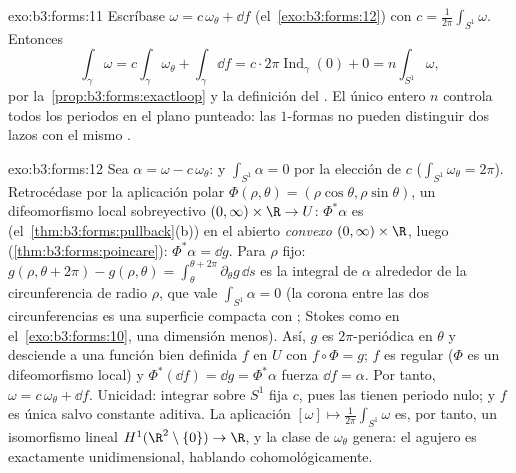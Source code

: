 \begin{solution}{exo:b3:forms:11}
Escríbase $\omega = c\,\omega_\theta + \dd f$
(el~\cref{exo:b3:forms:12}) con $c =
\frac1{2\pi}\int_{S^1}\omega$. Entonces
\[
\int_\gamma\omega = c\int_\gamma\omega_\theta +
\int_\gamma\dd f
= c\cdot2\pi\operatorname{Ind}_\gamma(0) + 0
= n\int_{S^1}\omega,
\]
por la~\cref{prop:b3:forms:exactloop} y la definición del . El
único entero $n$ controla todos los periodos en el plano punteado: las
$1$-formas  no pueden
distinguir dos lazos con el mismo .
\end{solution}

\begin{solution}{exo:b3:forms:12}
Sea $\alpha = \omega - c\,\omega_\theta$:
 y $\int_{S^1}\alpha = 0$ por
la elección de $c$ ($\int_{S^1}\omega_\theta = 2\pi$). Retrocédase por
la aplicación polar
$\Phi(\rho, \theta) = (\rho\cos\theta, \rho\sin\theta)$, un
difeomorfismo local sobreyectivo $(0, \infty)\times\R \to
U$: $\Phi^*\alpha$ es 
(el~\cref{thm:b3:forms:pullback}(b)) en el abierto \emph{convexo}
$(0,\infty)\times\R$, luego 
(\cref{thm:b3:forms:poincare}): $\Phi^*\alpha = \dd g$.
Para $\rho$ fijo: $g(\rho, \theta + 2\pi) - g(\rho, \theta)
= \int_\theta^{\theta + 2\pi}\partial_\theta g\,\dd s$ es la integral de
$\alpha$ alrededor de la circunferencia de radio $\rho$, que vale
$\int_{S^1}\alpha = 0$ (la corona entre las dos circunferencias es una
superficie compacta con
; Stokes como en
el~\cref{exo:b3:forms:10}, una dimensión menos). Así, $g$ es
$2\pi$-periódica en $\theta$ y desciende a una función bien definida $f$
en $U$ con $f\circ\Phi = g$; $f$ es regular ($\Phi$ es un difeomorfismo
local) y $\Phi^*(\dd f) = \dd g = \Phi^*\alpha$ fuerza $\dd f =
\alpha$. Por tanto, $\omega = c\,\omega_\theta + \dd f$. Unicidad:
integrar sobre $S^1$ fija $c$, pues las
 tienen periodo nulo; y
$f$ es única salvo constante aditiva. La aplicación $[\omega] \mapsto
\frac1{2\pi}\int_{S^1}\omega$ es, por tanto, un isomorfismo lineal
$H^1(\R^2\setminus\{0\}) \to \R$, y la clase de $\omega_\theta$ genera:
el agujero es exactamente unidimensional, hablando cohomológicamente.
\end{solution}

